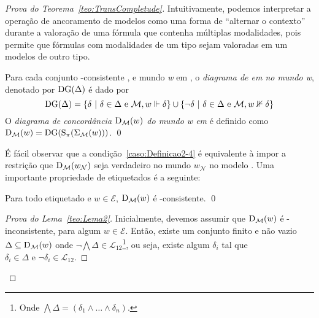 \begin{apendicesenv}
\begin{proof}[Prova do Teorema~\ref{teo:TransCompletude}]
            Intuitivamente, podemos interpretar a operação de ancoramento de modelos como uma forma de ``alternar o contexto'' durante a valoração de uma fórmula que contenha múltiplas
            modalidades, pois permite que fórmulas com modalidades de um tipo sejam valoradas em um modelos de outro tipo.

            \begin{definicao}[Diagramas]
                \label{def:Diagramas}
                Para cada conjunto -consistente \DDELTA, \PImodelo {} e mundo \textit{w} em , o \textit{diagrama de \DDELTA em 
                no mundo w}, denotado por \(\operatorname{DG}(\Delta)\) é dado por
                \[
                    \operatorname{DG}(\Delta) = \{\delta \ | \ \delta \in \Delta \text{ e } \mathcal{M}, w \Vdash \delta\} \cup \{\neg \delta \ | \ \delta \in \Delta \text{ e } \mathcal{M}, w \nVdash \delta\}
                \]
                O \textit{diagrama de concordância \(\operatorname{D}_{\mathcal{M}}(w)\) do mundo w em } é definido como
                \(\operatorname{D}_{\mathcal{M}}(w) = \operatorname{DG}(\operatorname{S}_{\pi}(\Sigma_{\mathcal{M}}(w)))\). \qed
            \end{definicao}

            É fácil observar que a condição~\ref{caso:Definicao2-4} é equivalente à impor a restrição que \(\operatorname{D}_{\mathcal{M}}(w_{\mathcal{N}})\) seja verdadeiro
            no mundo \(w_{\mathcal{N}}\) no modelo . Uma importante propriedade de \PImodelos etiquetados é a seguinte:

            \begin{lema}
                \label{teo:Lema2}
                Para todo \PImodelo etiquetado  e \(w \in \mathcal{E}\), \(\operatorname{D}_{\mathcal{M}}(w)\) é -consistente. \qed
            \end{lema}

            \begin{proof}[Prova do Lema~\ref{teo:Lema2}]
                Inicialmente, devemos assumir que \(\operatorname{D}_{\mathcal{M}}(w)\) é -inconsistente,
                para algum \(w \in \mathcal{E}\). Então, existe um conjunto finito e não vazio \(\Delta \subseteq \operatorname{D}_{\mathcal{M}}(w)\) onde
                \(\neg \bigwedge \Delta \in \mathcal{L}_{12}\)\footnote{Onde \(\bigwedge \Delta = (\delta_1 \land \dots \land \delta_n)\).}, ou seja,
                existe algum \(\delta_i\) tal que \(\delta_i \in \Delta \text{ e } \neg\delta_i \in \mathcal{L}_{12}\).


\end{proof}
\end{proof}
\end{apendicesenv}
